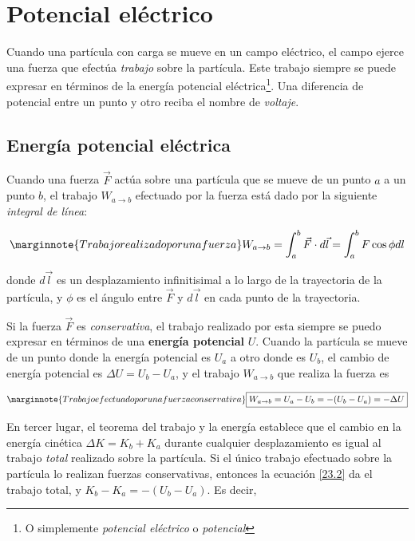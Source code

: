 \chapter{Potencial eléctrico }
Cuando una partícula con carga se mueve en un campo eléctrico, el campo ejerce una fuerza que efectúa \textit{trabajo} sobre la partícula. Este trabajo siempre se puede expresar en términos de la energía potencial eléctrica\footnote{O simplemente \textit{potencial eléctrico} o \textit{potencial}}. Una diferencia de potencial entre un punto y otro reciba el nombre de \textit{voltaje}.

\section{Energía potencial eléctrica}
Cuando una fuerza $\vec{F}$ actúa sobre una partícula que se mueve de un punto $a$ a un punto $b$, el trabajo $W_{a\to b}$ efectuado por la fuerza está dado por la siguiente \textit{integral de línea}:

\begin{equation}\label{23.1}\marginnote{Trabajo realizado por una fuerza}
W_{a\to b}=\int_a^b\vec{F}\cdot d\vec{l}=\int_a^bF\cos\phi dl
\end{equation}

donde $d\vec{l}$ es un desplazamiento infinitisimal a lo largo de la trayectoria de la partícula, y $\phi$ es el ángulo entre $\vec{F}$ y $d\vec{l}$ 	en cada punto de la trayectoria.

Si la fuerza $\vec{F}$ es \textit{conservativa}, el trabajo realizado por esta siempre se puedo expresar en términos de una \textbf{energía potencial} $U$. Cuando la partícula se mueve de un punto donde la energía potencial es $U_a$ a otro donde es $U_b$, el cambio de energía potencial es $\Delta U=U_b-U_a$, y el trabajo $W_{a\to b}$ que realiza la fuerza es

\begin{equation}\label{23.2}\marginnote{Trabajo efectuado por una fuerza conservativa}
\boxed{W_{a\to b}=U_a-U_b=-(U_b-U_a)=-\Delta U}
\end{equation}

En tercer lugar, el teorema del trabajo y la energía establece que el cambio en la energía cinética $\Delta K=K_b+K_a$ durante cualquier desplazamiento es igual al trabajo \textit{total} realizado sobre la partícula. Si el único trabajo efectuado sobre la partícula lo realizan fuerzas conservativas, entonces la ecuación \ref{23.2} da el trabajo total, y $K_b-K_a=-(U_b-U_a)$. Es decir, 

